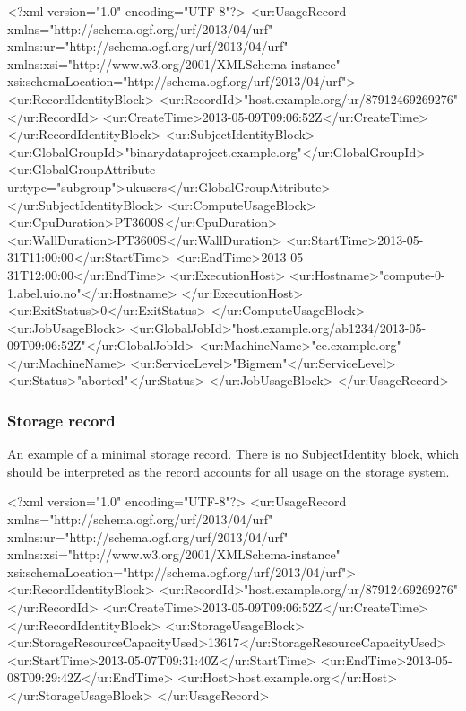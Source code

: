 \begin{XMLexample}
<?xml version="1.0" encoding="UTF-8"?>
<ur:UsageRecord xmlns="http://schema.ogf.org/urf/2013/04/urf"
    xmlns:ur="http://schema.ogf.org/urf/2013/04/urf"
    xmlns:xsi="http://www.w3.org/2001/XMLSchema-instance"
    xsi:schemaLocation="http://schema.ogf.org/urf/2013/04/urf">
    <ur:RecordIdentityBlock>
        <ur:RecordId>"host.example.org/ur/87912469269276"</ur:RecordId>
        <ur:CreateTime>2013-05-09T09:06:52Z</ur:CreateTime>
    </ur:RecordIdentityBlock>
    <ur:SubjectIdentityBlock>
        <ur:GlobalGroupId>"binarydataproject.example.org"</ur:GlobalGroupId>
        <ur:GlobalGroupAttribute ur:type="subgroup">ukusers</ur:GlobalGroupAttribute>
    </ur:SubjectIdentityBlock>
    <ur:ComputeUsageBlock>
        <ur:CpuDuration>PT3600S</ur:CpuDuration>
        <ur:WallDuration>PT3600S</ur:WallDuration>
        <ur:StartTime>2013-05-31T11:00:00</ur:StartTime>
        <ur:EndTime>2013-05-31T12:00:00</ur:EndTime>
        <ur:ExecutionHost>
            <ur:Hostname>"compute-0-1.abel.uio.no"</ur:Hostname>
        </ur:ExecutionHost>
        <ur:ExitStatus>0</ur:ExitStatus>
    </ur:ComputeUsageBlock>
    <ur:JobUsageBlock>
        <ur:GlobalJobId>"host.example.org/ab1234/2013-05-09T09:06:52Z"</ur:GlobalJobId>
        <ur:MachineName>"ce.example.org"</ur:MachineName>
        <ur:ServiceLevel>"Bigmem"</ur:ServiceLevel>
        <ur:Status>"aborted"</ur:Status>
    </ur:JobUsageBlock>
</ur:UsageRecord>
\end{XMLexample}

\subsubsection{Storage record}
An example of a minimal storage record. There is no SubjectIdentity block, which should be interpreted as the record accounts for all usage on the storage system.

\begin{XMLexample}
<?xml version="1.0" encoding="UTF-8"?>
<ur:UsageRecord xmlns="http://schema.ogf.org/urf/2013/04/urf"
    xmlns:ur="http://schema.ogf.org/urf/2013/04/urf"
    xmlns:xsi="http://www.w3.org/2001/XMLSchema-instance"
    xsi:schemaLocation="http://schema.ogf.org/urf/2013/04/urf">
    <ur:RecordIdentityBlock>
        <ur:RecordId>"host.example.org/ur/87912469269276"</ur:RecordId>
        <ur:CreateTime>2013-05-09T09:06:52Z</ur:CreateTime>
    </ur:RecordIdentityBlock>
    <ur:StorageUsageBlock>
        <ur:StorageResourceCapacityUsed>13617</ur:StorageResourceCapacityUsed>
        <ur:StartTime>2013-05-07T09:31:40Z</ur:StartTime>
        <ur:EndTime>2013-05-08T09:29:42Z</ur:EndTime>
        <ur:Host>host.example.org</ur:Host>
    </ur:StorageUsageBlock>
</ur:UsageRecord>
\end{XMLexample}

